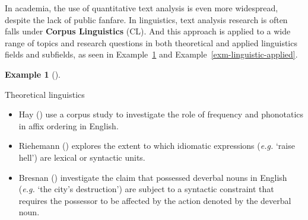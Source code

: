 \documentclass[
  letterpaper,
]{book}
\providecommand{\tightlist}{%
  \setlength{\itemsep}{0pt}\setlength{\parskip}{0pt}}\usepackage{longtable,booktabs,array}
\theoremstyle{definition}
\newtheorem{example}{Example}[chapter]
\theoremstyle{remark}
\begin{document}
In academia, the use of quantitative text analysis is even more
widespread, despite the lack of public fanfare. In linguistics, text
analysis research is often falls under
\textbf{Corpus Linguistics} (CL). And this
approach is applied to a wide range of topics and research questions in
both theoretical and applied linguistics fields and subfields, as seen
in Example~\ref{exm-linguistic-theory} and
Example~\ref{exm-linguistic-applied}.

\begin{example}[]\protect\hypertarget{exm-linguistic-theory}{}\label{exm-linguistic-theory}

Theoretical linguistics

\begin{itemize}
\tightlist
\item
  Hay () use a corpus study to investigate
  the role of frequency and phonotatics in affix ordering in English.
\item
  Riehemann () explores the extent to
  which idiomatic expressions (\emph{e.g.} `raise hell') are lexical or
  syntactic units.
\item
  Bresnan () investigate the claim that
  possessed deverbal nouns in English (\emph{e.g.} `the city's
  destruction') are subject to a syntactic constraint that requires the
  possessor to be affected by the action denoted by the deverbal noun.
\end{itemize}

\end{example}
\end{document}
